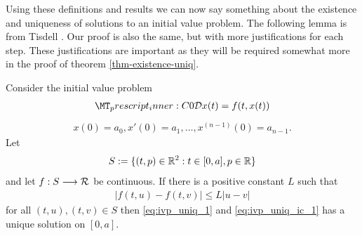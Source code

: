 Using these definitions and results we can now say something about the existence and uniqueness of solutions to an initial value problem. The following lemma is from Tisdell \cite{Tisdell2012}. Our proof is also the same, but with more justifications for each step. These justifications are important as they will be required somewhat more in the proof of theorem \ref{thm-existence-uniq}.

\begin{mdframed}[innertopmargin=10pt]
\begin{theorem}[Uniqueness]
    \label{thm:unique-tisdell}
    Consider the initial value problem 
    \begin{align}
        \label{eq:ivp_uniq_1}    
        \prescript{C}{0}{\mathcal{D}}x(t) = f(t,x(t))
    \end{align}
    \begin{align}
        \label{eq:ivp_uniq_ic_1}
        x(0) = a_0, x'(0) = a_1, \ldots, x^{(n-1)}(0) = a_{n-1}.
    \end{align}
    Let 
	\begin{align}
	    S:= \{ (t,p) \in \mathbb{R}^2 : t \in [0, a], p \in \mathbb{R} \} 
	\end{align}
	and let $ f : S \longrightarrow \mathcal{R} $ be continuous. If there is a positive constant $ L $ such that 
	\begin{align}
		\label{eq:ivp_uniq_1_lipshitz}
	    |f(t,u) - f(t,v)| \leq L|u-v| 
	\end{align}   
	for all $ (t,u), (t,v) \in S $
	then \eqref{eq:ivp_uniq_1} and \eqref{eq:ivp_uniq_ic_1} has a unique solution on $ [0, a] $.
\end{theorem}
\end{mdframed}
